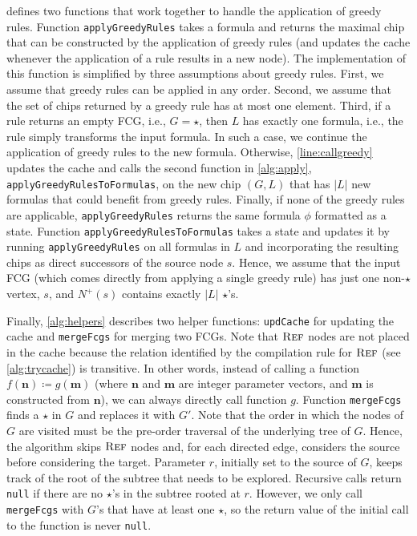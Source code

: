  defines two functions that work together to handle the
application of greedy rules. Function \texttt{applyGreedyRules} takes a formula
and returns the maximal chip that can be constructed by the application of
greedy rules (and updates the cache whenever the application of a rule results
in a new node). The implementation of this function is simplified by three
assumptions about greedy rules. First, we assume that greedy rules can be
applied in any order. Second, we assume that the set of chips returned by a
greedy rule has at most one element. Third, if a rule returns an empty FCG,
i.e., $G = \star$, then $L$ has exactly one formula, i.e., the rule simply
transforms the input formula. In such a case, we continue the application of
greedy rules to the new formula. Otherwise, \cref{line:callgreedy} updates the
cache and calls the second function in \cref{alg:apply},
\texttt{applyGreedyRulesToFormulas}, on the new chip $(G, L)$ that has $|L|$ new
formulas that could benefit from greedy rules. Finally, if none of the greedy
rules are applicable, \texttt{applyGreedyRules} returns the same formula $\phi$
formatted as a state. Function \texttt{applyGreedyRulesToFormulas} takes a state
and updates it by running \texttt{applyGreedyRules} on all formulas in $L$ and
incorporating the resulting chips as direct successors of the source node $s$.
Hence, we assume that the input FCG (which comes directly from applying a single
greedy rule) has just one non-$\star$ vertex, $s$, and $N^+(s)$ contains exactly
$|L|$ $\star$'s.


Finally, \cref{alg:helpers} describes two helper functions: \texttt{updCache}
for updating the cache and \texttt{mergeFcgs} for merging two FCGs. Note that
$\operatorname{\textsc{Ref}}$ nodes are not placed in the cache because the relation identified by the
compilation rule for $\operatorname{\textsc{Ref}}$ (see \cref{alg:trycache}) is transitive. In other
words, instead of calling a function $f(\mathbf{n}) \coloneqq g(\mathbf{m})$
(where $\mathbf{n}$ and $\mathbf{m}$ are integer parameter vectors, and
$\mathbf{m}$ is constructed from $\mathbf{n}$), we can always directly call
function $g$. Function \texttt{mergeFcgs} finds a $\star$ in $G$ and replaces it
with $G'$. Note that the order in which the nodes of $G$ are visited must be the
pre-order traversal of the underlying tree of $G$. Hence, the algorithm skips
$\operatorname{\textsc{Ref}}$ nodes and, for each directed edge, considers the source before
considering the target. Parameter $r$, initially set to the source of $G$, keeps
track of the root of the subtree that needs to be explored. Recursive calls
return \texttt{null} if there are no $\star$'s in the subtree rooted at $r$.
However, we only call \texttt{mergeFcgs} with $G$'s that have at least one
$\star$, so the return value of the initial call to the function is never
\texttt{null}.

